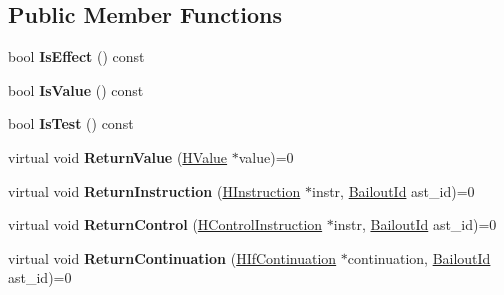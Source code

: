 \subsection*{Public Member Functions}
\begin{DoxyCompactItemize}
\item 
bool {\bfseries Is\+Effect} () const \hypertarget{classv8_1_1internal_1_1_ast_context_a9ef7dcdc0fc4878eac2fba9ec899cf74}{}\label{classv8_1_1internal_1_1_ast_context_a9ef7dcdc0fc4878eac2fba9ec899cf74}

\item 
bool {\bfseries Is\+Value} () const \hypertarget{classv8_1_1internal_1_1_ast_context_abab34ae1d1f4f30554e402981a9c8b41}{}\label{classv8_1_1internal_1_1_ast_context_abab34ae1d1f4f30554e402981a9c8b41}

\item 
bool {\bfseries Is\+Test} () const \hypertarget{classv8_1_1internal_1_1_ast_context_a745e8856780d7325898ee9ae28036876}{}\label{classv8_1_1internal_1_1_ast_context_a745e8856780d7325898ee9ae28036876}

\item 
virtual void {\bfseries Return\+Value} (\hyperlink{classv8_1_1internal_1_1_h_value}{H\+Value} $\ast$value)=0\hypertarget{classv8_1_1internal_1_1_ast_context_a02a778cd8697728b1d65c7784e81a708}{}\label{classv8_1_1internal_1_1_ast_context_a02a778cd8697728b1d65c7784e81a708}

\item 
virtual void {\bfseries Return\+Instruction} (\hyperlink{classv8_1_1internal_1_1_h_instruction}{H\+Instruction} $\ast$instr, \hyperlink{classv8_1_1internal_1_1_bailout_id}{Bailout\+Id} ast\+\_\+id)=0\hypertarget{classv8_1_1internal_1_1_ast_context_ac382417ecde5e65dd502ba717dfeb573}{}\label{classv8_1_1internal_1_1_ast_context_ac382417ecde5e65dd502ba717dfeb573}

\item 
virtual void {\bfseries Return\+Control} (\hyperlink{classv8_1_1internal_1_1_h_control_instruction}{H\+Control\+Instruction} $\ast$instr, \hyperlink{classv8_1_1internal_1_1_bailout_id}{Bailout\+Id} ast\+\_\+id)=0\hypertarget{classv8_1_1internal_1_1_ast_context_a0d14d70c6f23b3ed5a0b093546da90f7}{}\label{classv8_1_1internal_1_1_ast_context_a0d14d70c6f23b3ed5a0b093546da90f7}

\item 
virtual void {\bfseries Return\+Continuation} (\hyperlink{classv8_1_1internal_1_1_h_if_continuation}{H\+If\+Continuation} $\ast$continuation, \hyperlink{classv8_1_1internal_1_1_bailout_id}{Bailout\+Id} ast\+\_\+id)=0\hypertarget{classv8_1_1internal_1_1_ast_context_a31ce4d727e6c5c4476c385b53418aba9}{}\label{classv8_1_1internal_1_1_ast_context_a31ce4d727e6c5c4476c385b53418aba9}


\end{DoxyCompactItemize}
